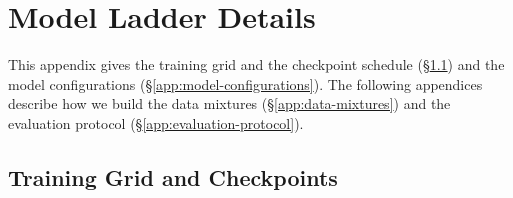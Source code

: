 \section{Model Ladder Details}
\label{app:methodology}

This appendix gives the training grid and the checkpoint schedule (\S\ref{app:training-grid}) and the model configurations (\S\ref{app:model-configurations}). The following appendices describe how we build the data mixtures (\S\ref{app:data-mixtures}) and the evaluation protocol (\S\ref{app:evaluation-protocol}).


\subsection{Training Grid and Checkpoints}
\label{app:training-grid}

